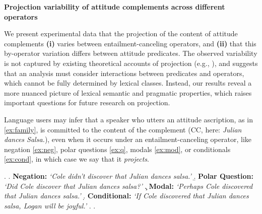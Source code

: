 \documentclass[12pt, a4paper]{article}
\begin{document}


\begin{center}
	\textbf{\large%
		Projection variability of attitude complements across different operators}
\end{center}

\vspace{-.7\baselineskip}
\noindent 
	We present experimental data that the projection of the content of attitude complements \textbf{(i)} varies between entailment-canceling operators, and \textbf{(ii)} that this by-operator variation differs between attitude predicates.
	The observed variability is not captured by existing theoretical accounts of projection
	(e.g., \citealt{heim_projection_1983,van_der_sandt_presupposition_1992,abrusan_predicting_2011,schlenker_triggering_2021}), and suggests that an analysis must consider interactions between predicates and operators, which cannot be fully determined by lexical classes. Instead, our results reveal a more nuanced picture of lexical semantic and pragmatic properties, which raises important questions for future research on projection.

	Language users may infer that a speaker who utters an attitude ascription, as in \ref{ex:family}, is committed to the content of the complement (CC, here: \emph{Julian dances Salsa.}),
	even when it occurs under an entailment-canceling operator, like negation \ref{ex:neg}, polar questions \ref{ex:q}, modals \ref{ex:mod}, or conditionals \ref{ex:cond}, in which case we say that it \emph{projects}.

	\vspace{-.5\baselineskip}
	\ex. \label{ex:family}
		\a. \label{ex:neg}
			{\bf Negation:} \hfill
			\emph{\lq Cole didn't discover that Julian dances salsa.\rq}
		\b. \label{ex:q}
			{\bf Polar Question:} \hfill
			\emph{\lq Did Cole discover that Julian dances salsa?\rq}
		\c. \label{ex:mod}
			{\bf Modal:} \hfill
			\emph{\lq Perhaps Cole discovered that Julian dances salsa.\rq}
		\d. \label{ex:cond}
			{\bf Conditional:} \hfill
			\emph{\lq If Cole discovered that Julian dances salsa, Logan will be joyful.\rq}
		\z.
	\z.
	
\end{document}
